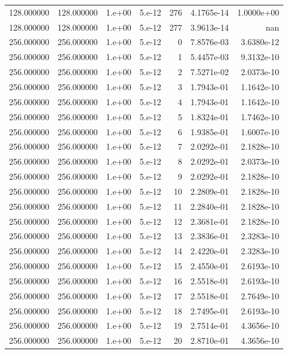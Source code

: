 \begin{table}[htbp]
\begin{tabular}{rrrrrrr}
128.000000 & 128.000000 & 1.e+00 & 5.e-12 & 276 & 4.1765e-14 & 1.0000e+00 \\
128.000000 & 128.000000 & 1.e+00 & 5.e-12 & 277 & 3.9613e-14 & nan \\
256.000000 & 256.000000 & 1.e+00 & 5.e-12 & 0 & 7.8576e-03 & 3.6380e-12 \\
256.000000 & 256.000000 & 1.e+00 & 5.e-12 & 1 & 5.4457e-03 & 9.3132e-10 \\
256.000000 & 256.000000 & 1.e+00 & 5.e-12 & 2 & 7.5271e-02 & 2.0373e-10 \\
256.000000 & 256.000000 & 1.e+00 & 5.e-12 & 3 & 1.7943e-01 & 1.1642e-10 \\
256.000000 & 256.000000 & 1.e+00 & 5.e-12 & 4 & 1.7943e-01 & 1.1642e-10 \\
256.000000 & 256.000000 & 1.e+00 & 5.e-12 & 5 & 1.8324e-01 & 1.7462e-10 \\
256.000000 & 256.000000 & 1.e+00 & 5.e-12 & 6 & 1.9385e-01 & 1.6007e-10 \\
256.000000 & 256.000000 & 1.e+00 & 5.e-12 & 7 & 2.0292e-01 & 2.1828e-10 \\
256.000000 & 256.000000 & 1.e+00 & 5.e-12 & 8 & 2.0292e-01 & 2.0373e-10 \\
256.000000 & 256.000000 & 1.e+00 & 5.e-12 & 9 & 2.0292e-01 & 2.1828e-10 \\
256.000000 & 256.000000 & 1.e+00 & 5.e-12 & 10 & 2.2809e-01 & 2.1828e-10 \\
256.000000 & 256.000000 & 1.e+00 & 5.e-12 & 11 & 2.2840e-01 & 2.1828e-10 \\
256.000000 & 256.000000 & 1.e+00 & 5.e-12 & 12 & 2.3681e-01 & 2.1828e-10 \\
256.000000 & 256.000000 & 1.e+00 & 5.e-12 & 13 & 2.3836e-01 & 2.3283e-10 \\
256.000000 & 256.000000 & 1.e+00 & 5.e-12 & 14 & 2.4220e-01 & 2.3283e-10 \\
256.000000 & 256.000000 & 1.e+00 & 5.e-12 & 15 & 2.4550e-01 & 2.6193e-10 \\
256.000000 & 256.000000 & 1.e+00 & 5.e-12 & 16 & 2.5518e-01 & 2.6193e-10 \\
256.000000 & 256.000000 & 1.e+00 & 5.e-12 & 17 & 2.5518e-01 & 2.7649e-10 \\
256.000000 & 256.000000 & 1.e+00 & 5.e-12 & 18 & 2.7495e-01 & 2.6193e-10 \\
256.000000 & 256.000000 & 1.e+00 & 5.e-12 & 19 & 2.7514e-01 & 4.3656e-10 \\
256.000000 & 256.000000 & 1.e+00 & 5.e-12 & 20 & 2.8710e-01 & 4.3656e-10 \\

\end{tabular}
\end{table}
